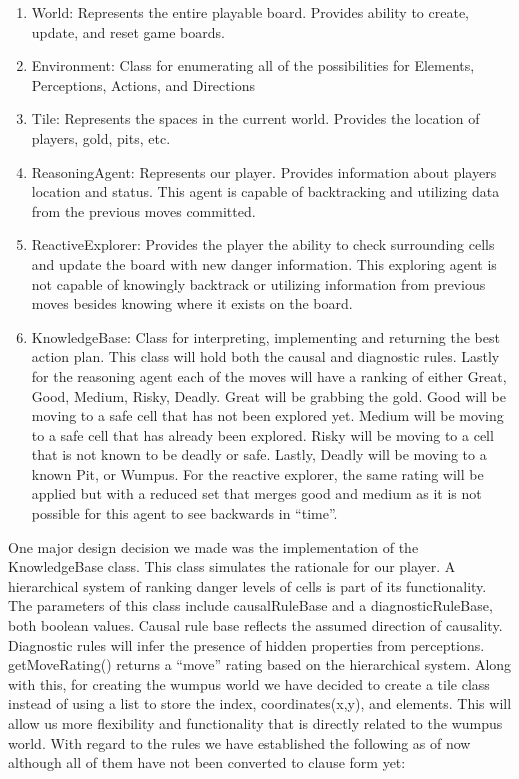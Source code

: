 \documentclass{article}
\begin{document}
\begin{enumerate}
    \item World: Represents the entire playable board. Provides ability to create, update, and reset game boards.
    \item Environment: Class for enumerating all of the possibilities for Elements, Perceptions, Actions, and Directions
    \item Tile: Represents the spaces in the current world. Provides the location of players, gold, pits, etc. 
    \item ReasoningAgent: Represents our player. Provides information about players location and status. This agent is capable of backtracking and utilizing data from the previous moves committed.
    \item ReactiveExplorer: Provides the player the ability to check surrounding cells and update the board with new danger information. This exploring agent is not capable of knowingly backtrack or utilizing information from previous moves besides knowing where it exists on the board.
    \item KnowledgeBase: Class for interpreting, implementing and returning the best action plan. This class will hold both the causal and diagnostic rules. Lastly for the reasoning agent each of the moves will have a ranking of either Great, Good, Medium, Risky, Deadly. Great will be grabbing the gold. Good will be moving to a safe cell that has not been explored yet. Medium will be moving to a safe cell that has already been explored. Risky will be moving to a cell that is not known to be deadly or safe. Lastly, Deadly will be moving to a known Pit, or Wumpus. For the reactive explorer, the same rating will be applied but with a reduced set that merges good and medium as it is not possible for this agent to see backwards in “time”.
\end{enumerate}




One major design decision we made was the implementation of the KnowledgeBase class. This class simulates the 
rationale for our player. A hierarchical system of ranking danger levels of cells is part of its functionality. 
The parameters of this class include causalRuleBase and a diagnosticRuleBase, both boolean values. Causal rule 
base reflects the assumed direction of causality. Diagnostic rules will infer the presence of hidden properties 
from perceptions. getMoveRating() returns a “move” rating based on the hierarchical system. Along with this, for 
creating the wumpus world we have decided to create a tile class instead of using a list to store the index, 
coordinates(x,y), and elements. This will allow us more flexibility and functionality that is directly related 
to the wumpus world. With regard to the rules we have established the following as of now although all of them have not 
been converted to clause form yet: 
\end{document}
